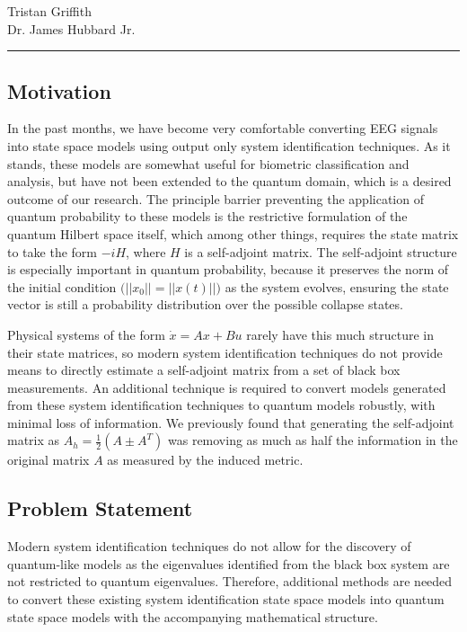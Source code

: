 \rhead{\today}
\begin{center}
{\large  Tristan Griffith}\\
\vspace{2mm}
{\large Dr. James Hubbard Jr.}
\noindent\rule{\textwidth}{2pt}
\end{center}
\setcounter{section}{1}

\subsection{Motivation}
In the past months, we have become very comfortable converting EEG signals into state space models using output only system identification techniques. As it stands, these models are somewhat useful for biometric classification and analysis, but have not been extended to the quantum domain, which is a desired outcome of our research. The principle barrier preventing the application of quantum probability to these models is the restrictive formulation of the quantum Hilbert space itself, which among other things, requires the state matrix to take the form $-iH$, where $H$ is a self-adjoint matrix. The self-adjoint structure is especially important in quantum probability, because it preserves the norm of the initial condition $\big(||x_0||=||x(t)||\big)$ as the system evolves, ensuring the state vector is still a probability distribution over the possible collapse states.

Physical systems of the form $\dot{x}=Ax+Bu $ rarely have this much structure in their state matrices, so modern system identification techniques do not provide means to directly estimate a self-adjoint matrix from a set of black box measurements. An additional technique is required to convert models generated from these system identification techniques to quantum models robustly, with minimal loss of information. We previously found that generating the self-adjoint matrix as $A_h=\frac{1}{2}(A \pm A^T)$  was removing as much as half the information in the original matrix $A$ as measured by the induced metric. 
\subsection{Problem Statement}
Modern system identification techniques do not allow for the discovery of quantum-like models as the eigenvalues identified from the black box system are not restricted to quantum eigenvalues. Therefore, additional methods are needed to convert these existing system identification state space models into quantum state space models with the accompanying mathematical structure.
